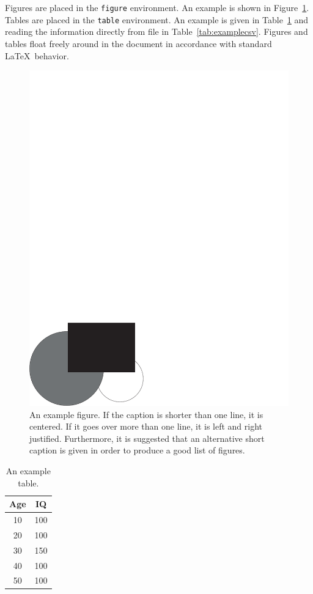 Figures are placed in the \texttt{figure} environment. An example is
shown in Figure~\ref{fig:example}. %
Tables are placed in the \texttt{table} environment. An example is given in
Table~\ref{tab:example} and reading the information directly from file in Table~\ref{tab:examplecsv}. Figures and tables float freely around in the
document in accordance with standard \LaTeX\ behavior.

\begin{figure}[tbp]  %
  \centering
  \includegraphics[width=.5\textwidth]{figures/example_fig}
  \caption[An example figure.]{An example figure. If the caption is
    shorter than one line, it is centered. If it goes over more than
    one line, it is left and right justified. Furthermore, it is
    suggested that an alternative short caption is given in order to
    produce a good list of figures.}
  \label{fig:example}
\end{figure}

\begin{table}[tbp]
  \centering
  \begin{tabular}{c|c}
    Age  & IQ  \\ 
    \hline
    10   & 100 \\
    20   & 100 \\
    30   & 150 \\
    40   & 100 \\
    50   & 100
  \end{tabular}
  \caption{An example table.}
  \label{tab:example}
\end{table}

